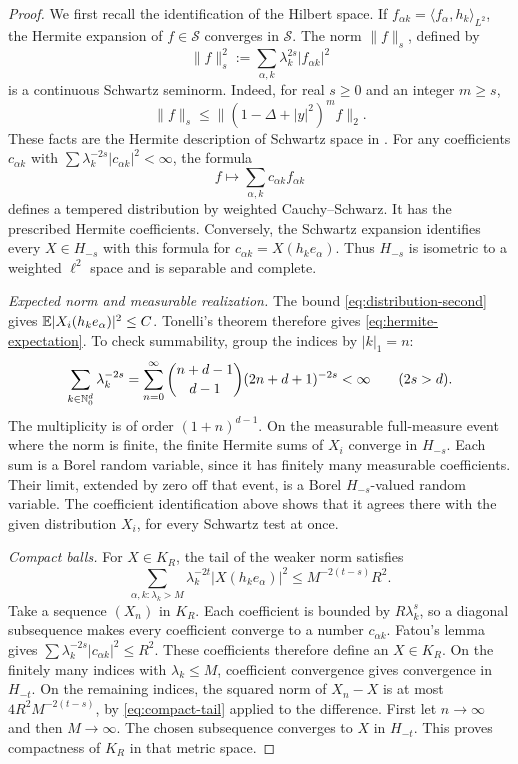 \documentclass[11pt,letterpaper,reqno]{amsart}
\begin{document}
\begin{proof}
We first recall the identification of the Hilbert space. If
$f_{\alpha k}=\langle f_\alpha,h_k\rangle_{L^2}$, the Hermite
expansion of $f\in\mathcal S$ converges in $\mathcal S$. The norm
$\|f\|_s$, defined by
\[
 \|f\|_s^2:=\sum_{\alpha,k}\lambda_k^{2s}|f_{\alpha k}|^2
\]
is a continuous Schwartz seminorm. Indeed, for real $s\ge0$ and
an integer $m\ge s$,
\[
 \|f\|_s\le\|(1-\Delta+|y|^2)^m f\|_2.
\]
These facts are the Hermite description
of Schwartz space in \cite[Sections~2, 4 and~5]{RadhaThangavelu}.
For any coefficients $c_{\alpha k}$ with
$\sum\lambda_k^{-2s}|c_{\alpha k}|^2<\infty$, the formula
\[
 f\longmapsto\sum_{\alpha,k}c_{\alpha k}f_{\alpha k}
\]
defines a tempered distribution by weighted Cauchy--Schwarz.
It has the prescribed Hermite coefficients. Conversely, the
Schwartz expansion identifies every $X\in H_{-s}$ with this
formula for $c_{\alpha k}=X(h_ke_\alpha)$. Thus $H_{-s}$ is
isometric to a weighted $\ell^2$ space and is separable and complete.

\emph{Expected norm and measurable realization.}
The bound \eqref{eq:distribution-second} gives
$\mathbb E|X_i(h_ke_\alpha)|^2\le C$. Tonelli's theorem therefore
gives \eqref{eq:hermite-expectation}. To check summability,
group the indices by $|k|_1=n$:
\begin{equation}\label{eq:hermite-trace}
 \sum_{k\in\mathbb N_0^d}\lambda_k^{-2s}
 =\sum_{n=0}^\infty
    \binom{n+d-1}{d-1}(2n+d+1)^{-2s}<\infty
 \qquad(2s>d).
\end{equation}
The multiplicity is of order $(1+n)^{d-1}$. On the measurable
full-measure event where the norm is finite, the finite Hermite
sums of $X_i$ converge in $H_{-s}$. Each sum is a Borel random
variable, since it has finitely many measurable coefficients.
Their limit, extended by zero off that event, is a Borel
$H_{-s}$-valued random variable. The coefficient identification
above shows that it agrees there with the given distribution
$X_i$, for every Schwartz test at once.

\emph{Compact balls.}
For $X\in K_R$, the tail of the weaker norm satisfies
\begin{equation}\label{eq:compact-tail}
 \sum_{\alpha,k:\lambda_k>M}\lambda_k^{-2t}
                    |X(h_ke_\alpha)|^2
 \le M^{-2(t-s)}R^2.
\end{equation}
Take a sequence $(X_n)$ in $K_R$. Each coefficient is bounded
by $R\lambda_k^s$, so a diagonal subsequence makes every
coefficient converge to a number $c_{\alpha k}$. Fatou's lemma
gives $\sum\lambda_k^{-2s}|c_{\alpha k}|^2\le R^2$.
These coefficients therefore define an $X\in K_R$. On the
finitely many indices with $\lambda_k\le M$, coefficient
convergence gives convergence in $H_{-t}$. On the remaining
indices, the squared norm of $X_n-X$ is at most
$4R^2M^{-2(t-s)}$, by \eqref{eq:compact-tail} applied to the
difference. First let $n\to\infty$ and then $M\to\infty$.
The chosen subsequence converges to $X$ in $H_{-t}$. This proves
compactness of $K_R$ in that metric space.


\end{proof}
\end{document}
